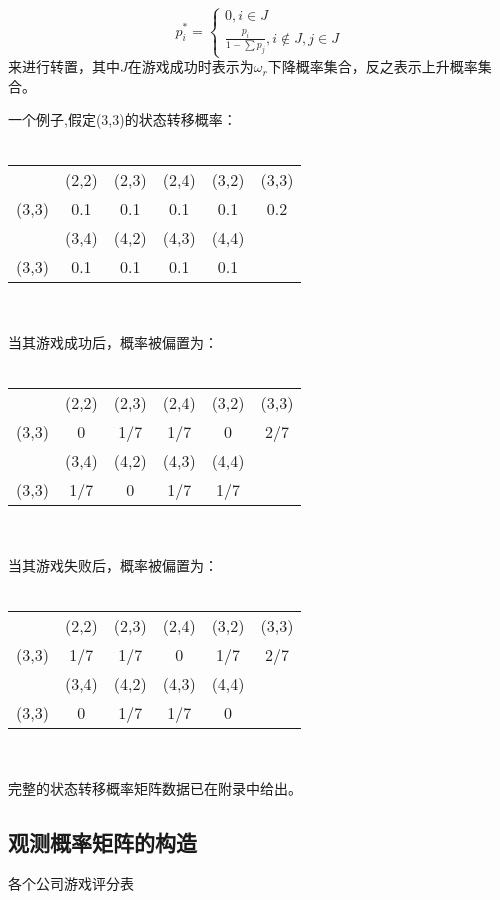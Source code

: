 \documentclass[hyperref]{ctexart}
\begin{document}
\begin{multicols}{2}
    \noindent
    \begin{equation*}
        p_i^* = \begin{cases} 0, i \in J \\ \frac{p_i}{1 - \sum p_j}, i \notin J ,j \in J\end{cases}
    \end{equation*}
    来进行转置，其中$J$在游戏成功时表示为$\omega_r$下降概率集合，反之表示上升概率集合。
    \par\indent\par
    一个例子,假定(3,3)的状态转移概率：\\
    \\
    \begin{tabular}{c|ccccc}
      & (2,2) & (2,3)  & (2,4) & (3,2) & (3,3)\\
	(3,3) & 0.1 & 0.1& 0.1& 0.1& 0.2\\
	\hline & (3,4) & (4,2) & (4,3) & (4,4) \\
	(3,3) & 0.1& 0.1& 0.1& 0.1
    \end{tabular}\\
    \par
    当其游戏成功后，概率被偏置为：\\ \\
    \begin{tabular}{c|ccccc}
      & (2,2) & (2,3)  & (2,4) & (3,2) & (3,3)\\
	(3,3) & 0 & 1/7 & 1/7 & 0& 2/7\\
	\hline & (3,4) & (4,2) & (4,3) & (4,4) \\
	(3,3) & 1/7& 0& 1/7& 1/7
    \end{tabular}\\
    \par
    当其游戏失败后，概率被偏置为：\\ \\
    \begin{tabular}{c|ccccc}
      & (2,2) & (2,3)  & (2,4) & (3,2) & (3,3)\\
	(3,3) & 1/7 & 1/7 & 0 & 1/7& 2/7\\
	\hline & (3,4) & (4,2) & (4,3) & (4,4) \\
	(3,3) & 0& 1/7 & 1/7& 0
    \end{tabular}\\
    \par
    完整的状态转移概率矩阵数据已在附录中给出。
    \subsection{观测概率矩阵的构造}
	    各个公司游戏评分表

\end{multicols}
\end{document}

